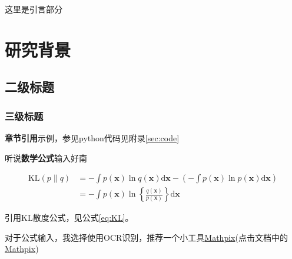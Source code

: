 \documentclass[AutoFakeBold]{fduthesis}
\begin{document}
\renewcommand\listfigurename{插\ 图\ 目\ 录}
\renewcommand\listtablename{表\ 格\ 目\ 录}
\listoffigures
{}
\listoftables
\mainmatter

\Intro
这里是引言部分


\chapter{研究背景}
\section{二级标题}
\subsection{三级标题}
\par \textbf{章节引用}示例，参见python代码见附录\ref{sec:code}
\par 听说\textbf{数学公式}输入好南

\begin{equation}
\begin{aligned}
\mathrm{KL}(p \| q) &=-\int p(\boldsymbol{x}) \ln q(\boldsymbol{x}) \mathrm{d} \boldsymbol{x}-\left(-\int p(\boldsymbol{x}) \ln p(\boldsymbol{x}) \mathrm{d} \boldsymbol{x}\right) \\
&=-\int p(\boldsymbol{x}) \ln \left\{\frac{q(\boldsymbol{x})}{p(\boldsymbol{x})}\right\} \mathrm{d} \boldsymbol{x}
\end{aligned}
\label{eq:KL}
\end{equation}

\par 引用KL散度公式，见公式\ref{eq:KL}。

\par 对于公式输入，我选择使用OCR识别，推荐一个小工具\href{https://accounts.mathpix.com/signup?referral_code=8ZTrrDwYv3}{Mathpix}(点击文档中的\href{https://accounts.mathpix.com/signup?referral_code=8ZTrrDwYv3}{Mathpix})
\end{document}
